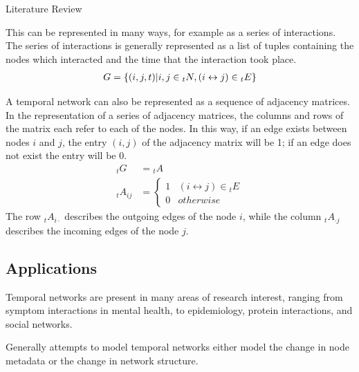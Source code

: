 \documentclass[12pt]{amsbook}
\begin{document}
\begin{chapter}{Literature Review}
\begin{figure}[H]
            \end{figure}
            This can be represented in many ways, for example as a series of interactions. The series of interactions is generally represented as a list of tuples containing the nodes which interacted and the time that the interaction took place. 
            \begin{align}
                G=\{(i, j, t)|\space i,j\in {_t} N, (i\leftrightarrow j)\in {_t}E \}
            \end{align}
            
            A temporal network can also be represented as a sequence of adjacency matrices. In the representation of a series of adjacency matrices, the columns and rows of the matrix each refer to each of the nodes. In this way, if an edge exists between nodes $i$ and $j$, the entry $(i,j)$ of the adjacency matrix will be 1; if an edge does not exist the entry will be 0.
            \begin{align}
                _t G &= {_t} A\\
                _t A_{ij} &=  
                \left\{
                    \begin{array}{ll} 
                    1 & (i\leftrightarrow j)\in {_t} E\\
                    0 & otherwise
                    \end{array}
                \right.
            \end{align}
            The row $_t A_{i\cdot}$ describes the outgoing edges of the node $i$, while the column $_t A_{\cdot j}$ describes the incoming edges of the node $j$.

        \subsection{Applications}
            Temporal networks are present in many areas of research interest, ranging from symptom interactions in mental health\cite{jordan2020current,contreras2020temporal}, to epidemiology\cite{masuda2013predicting}, protein interactions\cite{lucas2021inferring,jin2009identifying}, and social networks\cite{moinet2015burstiness,hanneke2010discrete}.     
            
            Generally attempts to model temporal networks either model the change in node metadata or the change in network structure.
            

\end{chapter}
\end{document}

